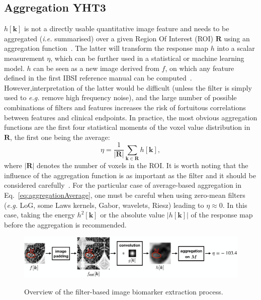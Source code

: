 \documentclass[fleqn,a4paper,oneside,openany]{book}
\newcommand\id[1]{{\hfill\normalsize{\idfont #1}}}
\begin{document}
\subsection[Aggregation]{Aggregation \id{YHT3}}
%
$h[\boldsymbol{k}]$ is not a directly usable quantitative image feature and needs to be aggregated (\textit{i.e.} summarised) over a given Region Of Interest (ROI) $\boldsymbol{R}$ using an aggregation function~\cite{DFA2017}.
The latter will transform the response map $h$ into a scalar measurement $\eta$, which can be further used in a statistical or machine learning model.
$h$ can be seen as a new image derived from $f$, on which any feature defined in the first IBSI reference manual can be computed~\cite{ZLV2017}.
However,interpretation of the latter would be difficult (unless the filter is simply used to \textit{e.g.} remove high frequency noise), and the large number of possible combinations of filters and features increases the risk of fortuitous correlations between features and clinical endpoints.
In practice, the most obvious aggregation functions are the first four statistical moments of the voxel value distribution in $\boldsymbol{R}$, the first one being the average:
%
\begin{equation}\label{eq:aggregationAverage}
\eta=
\frac{1}{|\boldsymbol{R}|}
\sum_{\boldsymbol{k}\in \boldsymbol{R}} h[\boldsymbol{k}],
\end{equation}
%
where $|\boldsymbol{R}|$ denotes the number of voxels in the ROI.
%
It is worth noting that the influence of the aggregation function is as important as the filter and it should be considered carefully~\cite{Dep2017}.
For the particular case of average-based aggregation in Eq.~\eqref{eq:aggregationAverage}, one must be careful when using zero-mean filters (\textit{e.g.} LoG, some Laws kernels, Gabor, wavelets, Riesz) leading to $\eta\approx 0$. In this case, taking the energy $h^2[\boldsymbol{k}]$ or the absolute value $|h[\boldsymbol{k}]|$ of the response map before the aggregation is recommended.
%
\begin{figure}
\centering
\includegraphics[trim = 0 0 0 0, clip, width=\linewidth]{overview.png}\\
\caption{Overview of the filter-based image biomarker extraction process.}
  \label{fig:overview}
\end{figure}
%
\end{document}
